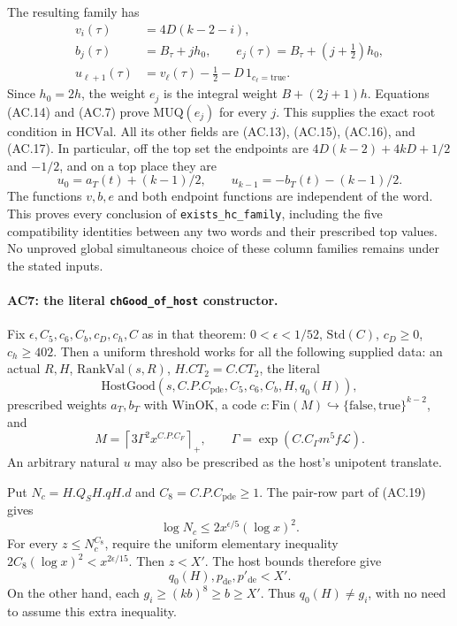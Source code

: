 \documentclass[11pt,a4paper]{article}
\numberwithin{equation}{section}
\theoremstyle{remark}\newtheorem{remark}[theorem]{Remark}
\begin{document}
The resulting family has
\[
 \begin{split}
 v_i(\tau)&=4D(k-2-i),\\
 b_j(\tau)&=B_\tau+jh_0,\qquad
 e_j(\tau)=B_\tau+(j+\tfrac12)h_0,\\
 u_{\ell+1}(\tau)&=v_\ell(\tau)-\tfrac12
                         -D\,1_{c_\ell=\mathrm{true}}.
 \end{split}                                                 \tag{AC.17}
\]
Since $h_0=2h$, the weight $e_j$ is the integral weight $B+(2j+1)h$.
Equations (AC.14) and (AC.7) prove $\mathrm{MUQ}(e_j)$ for every $j$.
This supplies the exact root condition in $\mathrm{HCVal}$.
All its other fields are (AC.13), (AC.15), (AC.16), and (AC.17).
In particular, off the top set the endpoints are
$4D(k-2)+4kD+1/2$ and $-1/2$, and on a top place they are
\[
         u_0=a_T(t)+(k-1)/2,\qquad
         u_{k-1}=-b_T(t)-(k-1)/2.                            \tag{AC.18}
\]
The functions $v,b,e$ and both endpoint functions are independent
of the word. This proves every conclusion of
\texttt{exists\_\allowbreak hc\_\allowbreak family}, including the five compatibility
identities between any two words and their prescribed top values.
No unproved global simultaneous choice of these column families
remains under the stated inputs.

\paragraph{AC7: the literal \texttt{chGood\_\allowbreak of\_\allowbreak host} constructor.}
Fix $\epsilon,C_5,c_6,C_b,c_D,c_h,C$ as in that theorem:
$0<\epsilon<1/52$, $\mathrm{Std}(C)$, $c_D\geq0$, $c_h\geq402$.
Then a uniform threshold works for all the following supplied data:
an actual $R,H$, $\mathrm{RankVal}(s,R)$,
$H.CT_2=C.CT_2$, the literal
\[
 \mathrm{HostGood}(s,C.P.C_{\mathrm{pde}},C_5,c_6,C_b,
                                      H,q_0(H)),
                                                               \tag{AC.19}
\]
prescribed weights $a_T,b_T$ with $\mathrm{WinOK}$, a code
$c:\mathrm{Fin}(M)\hookrightarrow\{\mathrm{false},\mathrm{true}\}^{k-2}$,
and
\[
 M=\left\lceil3\Gamma^2x^{C.P.C_F}\right\rceil_+,
       \qquad \Gamma=\exp(C.C_\Gamma m^5f\mathcal L).
                                                               \tag{AC.20}
\]
An arbitrary natural $u$ may also be prescribed as the host's
unipotent translate.

Put $N_c=H.Q_S H.q H.d$ and $C_8=C.P.C_{\mathrm{pde}}\geq1$.
The pair-row part of (AC.19) gives
\[
              \log N_c\leq2x^{\epsilon/5}(\log x)^2.
\]
For every $z\leq N_c^{C_8}$, require the uniform elementary
inequality
$2C_8(\log x)^2< x^{2\epsilon/15}$.
Then $z<X'$. The host bounds therefore give
\[
                q_0(H),p_{\mathrm{de}},p'_{\mathrm{de}}<X'.
                                                               \tag{AC.21}
\]
On the other hand, each $g_i\geq(kb)^8\geq b\geq X'$.
Thus $q_0(H)\ne g_i$, with no need to assume this extra inequality.
\end{document}
